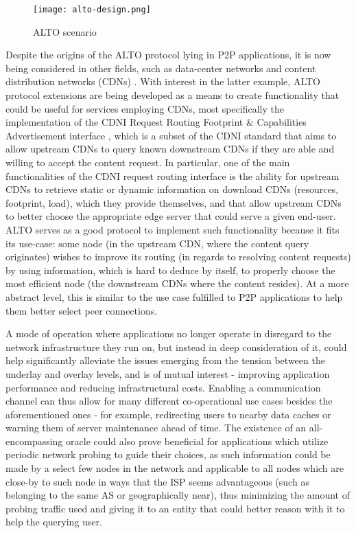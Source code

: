 \begin{figure}[!h]
\centering
\texttt{[image: alto-design.png]}
\caption{ALTO scenario \cite{seedorf2009}}
\label{fig:alto-design}
\end{figure}

    Despite the origins of the ALTO protocol lying in P2P applications, it is now being considered in other fields, such as data-center networks and content distribution networks (CDNs) \cite{alto-about}.
    With interest in the latter example, ALTO protocol extensions are being developed as a means to create functionality that could be useful for services employing CDNs, most specifically the implementation of the CDNI Request Routing Footprint \& Capabilities Advertisement interface \cite{alto-cdni}, which is a subset of the CDNI standard \cite{cdni-problem-statement} that aims to allow upstream CDNs to query known downstream CDNs if they are able and willing to accept the content request.
    In particular, one of the main functionalities of the CDNI request routing interface is the ability for upstream CDNs to retrieve static or dynamic information on download CDNs (resources, footprint, load), which they provide themselves, and that allow upstream CDNs to better choose the appropriate edge server that could serve a given end-user.
    ALTO serves as a good protocol to implement such functionality because it fits its use-case: some node (in the upstream CDN, where the content query originates) wishes to improve its routing (in regards to resolving content requests) by using information, which is hard to deduce by itself, to properly choose the most efficient node (the downstream CDNs where the content resides).
    At a more abstract level, this is similar to the use case fulfilled to P2P applications to help them better select peer connections.

    A mode of operation where applications no longer operate in disregard to the network infrastructure they run on, but instead in deep consideration of it, could help significantly alleviate the issues emerging from the tension between the underlay and overlay levels, and is of mutual interest - improving application performance and reducing infrastructural costs.
    Enabling a communication channel can thus allow for many different co-operational use cases besides the aforementioned ones - for example, redirecting users to nearby data caches or warning them of server maintenance ahead of time.
    The existence of an all-encompassing oracle could also prove beneficial for applications which utilize periodic network probing to guide their choices, as such information could be made by a select few nodes in the network and applicable to all nodes which are close-by to such node in ways that the ISP seems advantageous (such as belonging to the same AS or geographically near), thus minimizing the amount of probing traffic used and giving it to an entity that could better reason with it to help the querying user.

